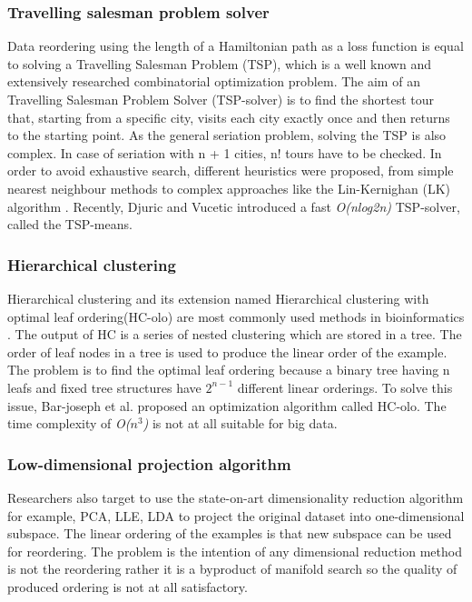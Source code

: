 \subsubsection{Travelling salesman problem solver}
Data reordering using the length of a Hamiltonian path as a loss function is equal to solving a Travelling Salesman Problem (TSP), which is a well known and extensively researched combinatorial optimization problem. The aim of an Travelling Salesman Problem Solver (TSP-solver) is to find the shortest tour that, starting from a specific city, visits each city exactly once and then returns to the starting point. As the general seriation problem, solving the TSP is also complex. In case of seriation with n + 1 cities, n! tours have to be checked. In order to avoid exhaustive search, different heuristics were proposed, from simple nearest neighbour methods to complex approaches like the Lin-Kernighan (LK) algorithm \cite{p308}. Recently, Djuric and Vucetic \cite{1thesis3} introduced a fast \textit{O(nlog2n)} TSP-solver, called the TSP-means.
\subsubsection{Hierarchical clustering}
Hierarchical clustering and its extension named Hierarchical clustering with optimal leaf ordering(HC-olo) are most commonly used methods in bioinformatics \cite{1thesis3}. The output of HC is a series of nested clustering which are stored in a tree. The order of leaf nodes in a tree is used to produce the linear order of the example. The problem is to find the optimal leaf ordering because a binary tree having n leafs and fixed tree structures have $2^{n-1}$ different linear orderings. To solve this issue, Bar-joseph et al. \cite{p311} proposed an optimization algorithm called HC-olo. The time complexity of \textit{O($n^3$)} is not at all suitable for big data.
\subsubsection{Low-dimensional projection algorithm}
Researchers also target to use the state-on-art dimensionality reduction algorithm for example, PCA, LLE, LDA to project the original dataset into one-dimensional subspace. The linear ordering of the examples is that new subspace can be used for reordering. The problem is the intention of any dimensional reduction method is not the reordering rather it is a byproduct of manifold search so the quality of produced ordering is not at all satisfactory.

